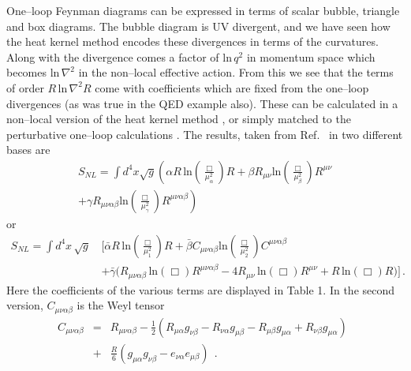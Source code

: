 \documentclass[12pt]{article}
\begin{document}
One--loop Feynman diagrams can be expressed in terms of scalar bubble, triangle and box diagrams. The bubble diagram is UV divergent, and we have seen how the heat kernel method encodes these divergences in terms of the curvatures. Along with the divergence comes a factor of $\text{ln}\, q^2$ in momentum space which becomes $\text{ln}\, \nabla^2$ in the non--local effective action. From this we see that the terms of order $R \,\text{ln}\, \nabla^2 R$ come with coefficients which are fixed from the one--loop divergences (as was true in the QED example also). These can be calculated in a non--local version of the heat kernel method \cite{Barvinsky:1985an, Codello:2012kq}, or simply matched to the perturbative one--loop calculations \cite{Donoghue:2014yha}. The results, taken from Ref.~\cite{Donoghue:2014yha} in two different bases are
\begin{align}
\nonumber
S_{NL} = \int d^4x \sqrt{g} \left( \alpha R \,\text{ln} \left(\frac{\Box}{\mu_{\alpha}^2}\right) R  + \beta R_{\mu\nu} \text{ln} \left(\frac{\Box}{\mu_{\beta}^2}\right) R^{\mu\nu} \right.\\+\left.\gamma R_{\mu\nu\alpha\beta} \text{ln} \left(\frac{\Box}{\mu_{\gamma}^2}\right) R^{\mu\nu\alpha\beta} \right)
\label{generalL}
\end{align}
or
\begin{align}
\nonumber
S_{NL} = \int d^4x \, \sqrt{g} \, & \bigl[\bar{\alpha} R\, \text{ln} \left(\frac{\Box}{\mu_1^2}\right) R + \bar{\beta} C_{\mu\nu\alpha\beta} \text{ln} \left(\frac{\Box}{\mu_2^2}\right) C^{\mu\nu\alpha\beta}\\ &+ \bar{\gamma} \bigl(R_{\mu\nu\alpha\beta}\,\text{ln} \left({\Box}\right)R^{\mu\nu\alpha\beta} - 4 R_{\mu\nu}\,\text{ln} \left({\Box}\right) R^{\mu\nu}
+ R \,\text{ln} \left({\Box}\right) R \bigr)\bigr]\, .
\label{GB}
\end{align}
Here the coefficients of the various terms are displayed in Table 1. In the second version, $C_{\mu\nu\alpha\beta} $ is the Weyl tensor
\begin{eqnarray}
C_{\mu\nu\alpha\beta} &=& {R}_{\mu\nu\alpha\beta} -\frac12 \left( {R}_{\mu\alpha} g_{\nu\beta} - {R}_{\nu\alpha} g_{\mu\beta} - {R}_{\mu\beta} g_{\mu\alpha} + {R}_{\nu\beta} g_{\mu\alpha} \right) \ \ \nonumber \\
&+& \frac{{R}}{6}\left(g_{\mu\alpha} g_{\nu\beta} - e_{\nu\alpha} e_{\mu\beta} \right)  \ \  .
\end{eqnarray}
\end{document}
